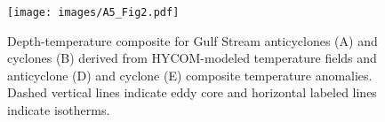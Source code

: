 \clearpage


\begin{figure}[htbp]
\centering
\texttt{[image: images/A5\_Fig2.pdf]}
\caption[Depth-temperature composite and anomaly for Gulf Stream eddies]{Depth-temperature composite for Gulf Stream anticyclones (A) and cyclones (B) derived from HYCOM-modeled temperature fields and anticyclone (D) and cyclone (E) composite temperature anomalies. Dashed vertical lines indicate eddy core and horizontal labeled lines indicate isotherms.}
\label{fig:a5f2} %
\end{figure}

\clearpage

